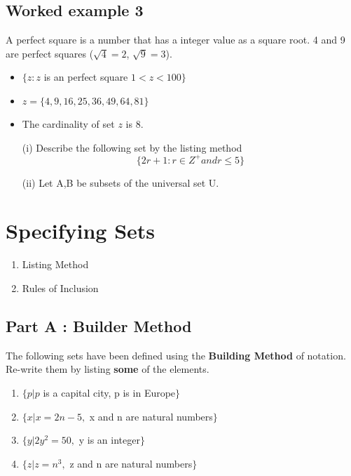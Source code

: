 \documentclass[11pt,a4paper,titlepage,oneside,openany]{article}
\numberwithin{equation}{section}
\numberwithin{algorithm}{section}
\numberwithin{figure}{section}
\numberwithin{table}{section}
\begin{document}
\subsection*{Worked example 3}
A perfect square is a number that has a integer value as a
square root. 4 and 9 are perfect squares ($\sqrt{4} = 2$,
$\sqrt{9} = 3$).
\begin{itemize}
\item $\{ z : z $ is an perfect square $ 1 < z < 100 \}$
\item $z = \{4,9,16,25,36,49,64,81\}$
\item The cardinality of set $z$ is 8.
\end{itemize}

\newpage




\begin{itemize}
	\item[(i)] Describe the following set by the listing method
	\[ \{ 2r+1 : r \in Z^{+} and r \leq 5  \} \]
	\item[(ii)] Let A,B be subsets of the universal set U.
	
	
\end{itemize}

\section{Specifying Sets}



\begin{enumerate}
\item Listing Method
\item Rules of Inclusion
\end{enumerate}

\subsection*{Part A : Builder Method}
The following sets have been defined using the \textbf{Building Method} of notation. Re-write them by listing \textbf{some} of the elements.
\begin{enumerate}
\item $\{p | p$ is a capital city, p is in Europe$\}$
\item $\{x | x = 2n - 5,$ x and n are natural numbers$\}$
\item $\{y | 2y^2 = 50,$ y is an integer$\}$
\item $\{z | z = n^3,$ z and n are natural numbers$\}$
\end{enumerate}
\end{document}
